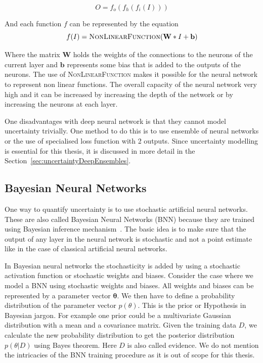 \documentclass[12pt, twoside, ngerman]{report}
\begin{document}
\begin{equation}
O = f_o(f_h(f_i(I)))
\end{equation}

And each function $f$ can be represented by the equation
\begin{equation}
f(I) = \textsc{NonLinearFunction}(\textbf{W} * I + \textbf{b})
\end{equation}

Where the matrix $\textbf{W}$  holds the weights of the connections to the neurons of the current layer and $\textbf{b}$ represents some bias that is added to the outputs of the neurons.
The use of \textsc{NonLinearFunction} makes it possible for the neural network to represent non linear functions.
The overall capacity of the neural network very high and it can be increased by increasing the depth of the network or by increasing the neurons at each layer.

One disadvantages with deep neural network is that they cannot model uncertainty trivially.
One method to do this is to use ensemble of neural networks or the use of specialised loss function with 2 outputs.
Since uncertainty modelling is essential for this thesis,  it is discussed in more detail in the Section~\ref{sec:uncertaintyDeepEnsembles}.

\subsection{Bayesian Neural Networks}
One way to quantify uncertainty is to use stochastic artificial neural networks.
These are also called Bayesian Neural Networks (BNN) because they are trained using Bayesian inference mechanism~\cite{BayesianNeuralNetworks}.
The basic idea is to make sure that the output of any layer in the neural network is stochastic and not a point estimate like in the case of classical artificial neural networks.

In Bayesian neural networks the stochasticity is added by using a stochastic activation function or stochastic weights and biases.
Consider the case where we model a BNN using stochastic weights and biases.
All weights and biases can be represented by a parameter vector $\mathbf{\theta}$.
We then have to define a probability distribution of the parameter vector $p(\theta)$.
This is the prior or Hypothesis in Bayesian jargon.
For example one prior could be a multivariate Gaussian distribution with a mean and a covariance matrix.
Given the training data $D$,  we calculate the new probability distribution to get the posterior distribution $p(\theta | D)$ using Bayes theorem.
Here $D$ is also called evidence.
We do not mention the intricacies of the BNN training procedure as it is out of scope for this thesis.
\end{document}
